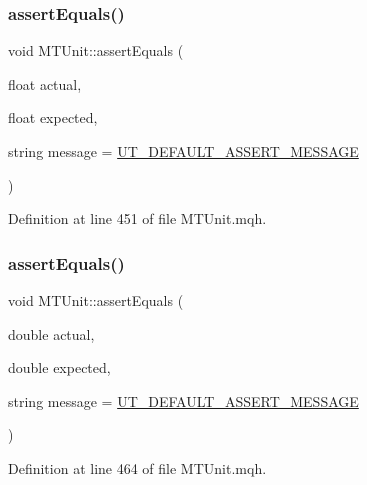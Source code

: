 \subsubsection{\texorpdfstring{assert\+Equals()}{assertEquals()}\hspace{0.1cm}{\footnotesize\ttfamily [10/28]}}
{\footnotesize\ttfamily void M\+T\+Unit\+::assert\+Equals (\begin{DoxyParamCaption}\item[{float}]{actual,  }\item[{float}]{expected,  }\item[{string}]{message = {\ttfamily \mbox{\hyperlink{_m_t_unit_8mqh_a96f5d62188d09039ebc3f443c9120e39}{U\+T\+\_\+\+D\+E\+F\+A\+U\+L\+T\+\_\+\+A\+S\+S\+E\+R\+T\+\_\+\+M\+E\+S\+S\+A\+GE}}} }\end{DoxyParamCaption})}



Definition at line 451 of file M\+T\+Unit.\+mqh.

\mbox{\label{class_m_t_unit_a4c034b46096ff7d378a00c24d15def01}} 
\subsubsection{\texorpdfstring{assert\+Equals()}{assertEquals()}\hspace{0.1cm}{\footnotesize\ttfamily [11/28]}}
{\footnotesize\ttfamily void M\+T\+Unit\+::assert\+Equals (\begin{DoxyParamCaption}\item[{double}]{actual,  }\item[{double}]{expected,  }\item[{string}]{message = {\ttfamily \mbox{\hyperlink{_m_t_unit_8mqh_a96f5d62188d09039ebc3f443c9120e39}{U\+T\+\_\+\+D\+E\+F\+A\+U\+L\+T\+\_\+\+A\+S\+S\+E\+R\+T\+\_\+\+M\+E\+S\+S\+A\+GE}}} }\end{DoxyParamCaption})}



Definition at line 464 of file M\+T\+Unit.\+mqh.

\mbox{\label{class_m_t_unit_ab7b8a4b1fd0155d1e4ead57190b42b25}} 
